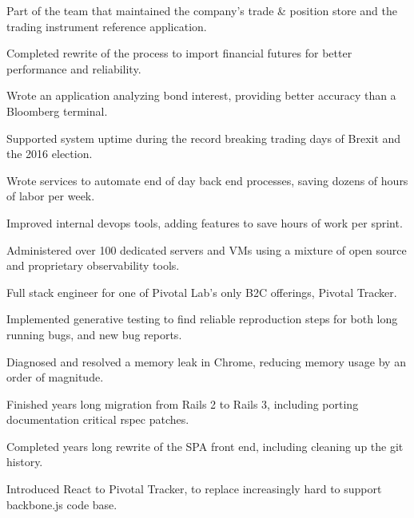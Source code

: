\documentclass[]{deedy-resume-openfont}
\begin{document}
\vspace{\topsep}
\begin{tightemize}
\item Part of the team that maintained the company's trade \& position store and the trading instrument reference application.
\item Completed rewrite of the process to import financial futures for better performance and reliability.
\item Wrote an application analyzing bond interest, providing better accuracy than a Bloomberg terminal.
\item Supported system uptime during the record breaking trading days of Brexit and the 2016 election.
\item Wrote services to automate end of day back end processes, saving dozens of hours of labor per week.
\item Improved internal devops tools, adding features to save hours of work per sprint.
\item Administered over 100 dedicated servers and VMs using a mixture of open source and proprietary observability tools.
\end{tightemize}
\sectionsep

\vspace{\topsep}
Full stack engineer for one of Pivotal Lab's only B2C offerings, Pivotal Tracker.
\vspace{\topsep}
\begin{tightemize}
\item Implemented generative testing to find reliable reproduction steps for both long running bugs, and new bug reports.
\item Diagnosed and resolved a memory leak in Chrome, reducing memory usage by an order of magnitude.
\item Finished years long migration from Rails 2 to Rails 3, including porting documentation critical rspec patches.
\item Completed years long rewrite of the SPA front end, including cleaning up the git history.
\item Introduced React to Pivotal Tracker, to replace increasingly hard to support backbone.js code base.
\end{tightemize}
\end{document}
